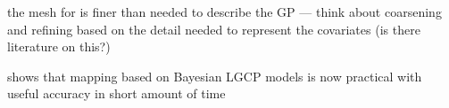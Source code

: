 \documentclass[]{interact}
\begin{document}
the mesh for is finer than needed to describe the GP --- think about coarsening
and refining based on the detail needed to represent the covariates (is there
literature on this?)

shows that mapping based on Bayesian LGCP models is now practical with
useful accuracy in short amount of time









\end{document}
